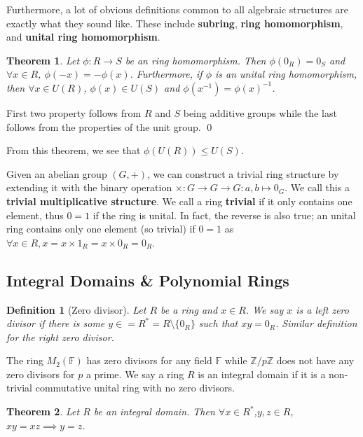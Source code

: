\documentclass[
]{article}
\newtheorem{theorem}{Theorem}
\newtheorem{definition}{Definition}[theorem]
\begin{document}
Furthermore, a lot of obvious definitions common to all algebraic
structures are exactly what they sound like. These include
\textbf{subring}, \textbf{ring homomorphism}, and \textbf{unital ring
homomorphism}.

\begin{theorem}
  Let \(\phi : R \to S\) be an ring homomorphism. Then \(\phi(0_R) =0_S\) and 
  \(\forall x \in R\), \(\phi(-x) = -\phi(x)\). Furthermore, if \(\phi\) is an 
  unital ring homomorphism, then \(\forall x \in U(R)\),
  \(\phi(x) \in U(S)\) and \(\phi(x^{-1}) = \phi(x)^{-1}\).
\end{theorem}
\proof

First two property follows from \(R\) and \(S\) being additive groups
while the last follows from the properties of the unit group. \qed

From this theorem, we see that \(\phi(U(R)) \le U(S)\).

Given an abelian group \((G, +)\), we can construct a trivial ring
structure by extending it with the binary operation
\(\times : G \to G \to G : a, b \mapsto 0_G\). We call this a
\textbf{trivial multiplicative structure}. We call a ring
\textbf{trivial} if it only contains one element, thus \(0 = 1\) if the
ring is unital. In fact, the reverse is also true; an unital ring
contains only one element (so trivial) if \(0 = 1\) as
\(\forall x \in R, x = x \times 1_R = x \times 0_R = 0_R\).

\hypertarget{integral-domains-polynomial-rings}{%
\subsection{Integral Domains \& Polynomial
Rings}\label{integral-domains-polynomial-rings}}

\begin{definition} [Zero divisor]
  Let \(R\) be a ring and \(x \in R\). We say \(x\) is a left zero divisor if 
  there is some \(y \in = R^* = R \setminus\{0_R\}\) such that \(xy = 0_R\). 
  Similar definition for the right zero divisor.
\end{definition}

The ring \(M_2(\mathbb{F})\) has zero divisors for any field
\(\mathbb{F}\) while \(\mathbb{Z} / p\mathbb{Z}\) does not have any zero
divisors for \(p\) a prime. We say a ring \(R\) is an integral domain if
it is a non-trivial commutative unital ring with no zero divisors.

\begin{theorem}
  Let \(R\) be an integral domain. Then \(\forall x \in R^*\),\(y, z \in R\),
  \(xy = xz \implies y = z\).
\end{theorem}
\proof
\end{document}
